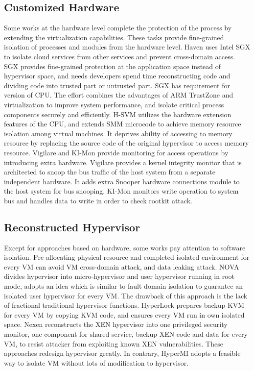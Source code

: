 \documentclass[conference]{IEEEtran}
\begin{document}
\subsection{Customized Hardware }
Some works at the hardware level complete the protection of the process by extending the virtualization capabilities. These tasks provide fine-grained isolation of processes and modules from the hardware level. Haven \cite{haven} uses Intel SGX\cite{Hoekstra13cuvillo,Mckeen2013Innovative} to isolate cloud services from other services and prevent cross-domain access. SGX provides fine-grained protection at the application space instead of hypervisor space, and needs developers spend time reconstructing code and dividing code into trusted part or untrusted part. SGX has requirement for version of CPU. The effort \cite{Cho2016Hardware} combines the advantages of ARM TrustZone and virtualization to improve system performance, and isolate critical process components securely and efficiently. H-SVM\cite{Jin2015H} utilizes the hardware extension features of the CPU, and extends SMM microcode to achieve memory resource isolation among virtual machines. It deprives ability of accessing to memory resource by replacing the source code of the original hypervisor to access memory resource. Vigilare\cite{Moon2012Vigilare} and KI-Mon \cite{Lee2013KI} provide monitoring for access operations by introducing extra hardware. Vigilare provides a kernel integrity monitor that is architected to snoop the bus traffic of the host system from a separate independent hardware. It adds extra Snooper hardware connections module to the host system for bus snooping. KI-Mon monitors write operation to system bus and handles data to write in order to check rootkit attack.

\subsection{Reconstructed Hypervisor }
Except for approaches based on hardware, some works\cite{nexen,Steinberg2010NOVA,hyperlock} pay attention to software isolation. Pre-allocating physical resource and completed isolated environment for every VM can avoid VM cross-domain attack, and data leaking attack. NOVA\cite{Steinberg2010NOVA} divides hypervisor into micro-hypervisor and user hypervisor running in root mode, adopts an idea which is similar to fault domain isolation to guarantee an isolated user hypervisor for every VM. The drawback of this approach is the lack of fractional traditional hypervisor functions. HyperLock \cite{hyperlock} prepares backup KVM for every VM by copying KVM code, and ensures every VM run in own isolated space. Nexen\cite{nexen} reconstructs the XEN hypervisor into one privileged security monitor, one component for shared service, backup XEN code and data for every VM, to resist attacker from exploiting known XEN vulnerabilities. These approaches redesign hypervisor greatly. In contrary, HyperMI adopts a feasible way to isolate VM without lots of modification to hypervisor. 
\end{document}
